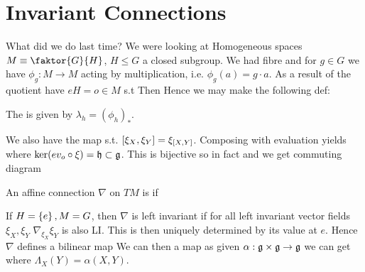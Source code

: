 \documentclass{article}
\begin{document}
\section{Invariant Connections} 
What did we do last time? We were looking at Homogeneous spaces $M \equiv \faktor{G}{H}$, $H\leq G$ a closed subgroup. We had fibre 
and for $g \in G$ we have $\phi_g : M \to M$ acting by multiplication, i.e. $\phi_g(a) = g \cdot a$. As a result of the quotient have $eH = o \in M$ s.t 
Then 
Hence we may make the following def:
\begin{definition}
The 
is given by $\lambda_h = (\phi_h)_\ast$. 
\end{definition}
We also have the map
s.t. $\comm[\xi_X]{\xi_Y} = \xi_{\comm[X]{Y}}$. Composing with evaluation yields
where $\ker(ev_o \circ \xi) = \mf{h} \subset \mf{g}$. This is bijective so in fact 
and we get commuting diagram 
\begin{center}
\end{center}

\begin{definition}
An affine connection $\nabla$ on $TM$ is  if 
\end{definition}

If $H = \pbrace{e}, M=G$, then $\nabla$ is left invariant if for all left invariant vector fields $\xi_X,\xi_Y$ $\nabla_{\xi_X} \xi_Y$ is also LI. This is then uniquely determined by its value at $e$. Hence $\nabla $ defines a bilinear map 
We can then  a map as given $\alpha : \mf{g} \times \mf{g} \to \mf{g}$ we can get 
where $\Lambda_X(Y) = \alpha(X,Y)$. 
\end{document}
